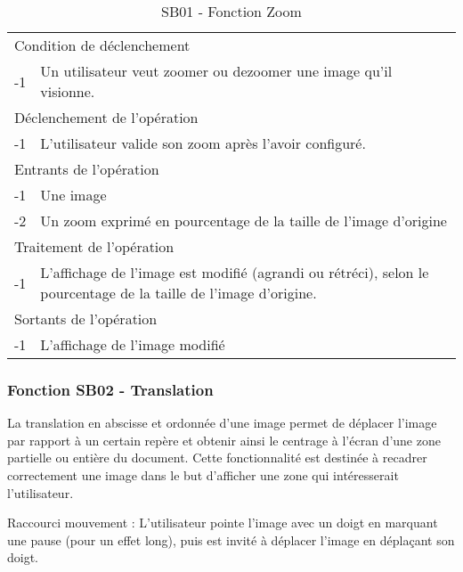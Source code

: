 \documentclass[a4paper]{article}
\begin{document}
\begin{table}[H]
  \centering
   \small
	\begin{tabular}{|c|p{12cm}|}
   		\hline
   			\rowcolor{lightgray}\multicolumn{2}{|c|}{\textbf{SB01 - Fonction Zoom}} \\
   		\hline
   			\multicolumn{2}{|l|}{Condition de d\'eclenchement} \\
   		\hline
   			-1 & Un utilisateur veut zoomer ou dezoomer une image qu'il visionne. \\
   		\hline
   			\multicolumn{2}{|l|}{D\'eclenchement de l'op\'eration} \\
   		\hline
   			-1 & L'utilisateur valide son zoom après l'avoir configuré. \\
   		\hline
   			\multicolumn{2}{|l|}{Entrants de l'op\'eration} \\
   		\hline
   			-1 & Une image \\
        	-2 & Un zoom exprimé en pourcentage de la taille de l'image d'origine \\ 	
        \hline
   			\multicolumn{2}{|l|}{Traitement de l'op\'eration} \\
  		\hline
   			-1 & L'affichage de l'image est modifié (agrandi ou rétréci), selon le pourcentage de la taille de l'image d'origine. \\
   		\hline
   			\multicolumn{2}{|l|}{Sortants de l'op\'eration} \\
   		\hline
   			-1 & L'affichage de l'image modifié \\
   		\hline
	\end{tabular}
  \caption{SB01 - Fonction Zoom}
  \normalsize
  \label{tab:visu_img_zoom}
\end{table}


\subsubsection{Fonction SB02 - Translation}

La translation en abscisse et ordonnée d'une image permet de déplacer l'image par rapport à un certain repère et obtenir ainsi le centrage à l'écran d'une zone partielle ou entière du document. Cette fonctionnalité est destinée à recadrer correctement une image dans le but d'afficher une zone qui intéresserait l'utilisateur.

Raccourci mouvement : L'utilisateur pointe l'image avec un doigt en marquant une pause (pour un effet long), puis est invité à déplacer l'image en déplaçant son doigt.
\end{document}
